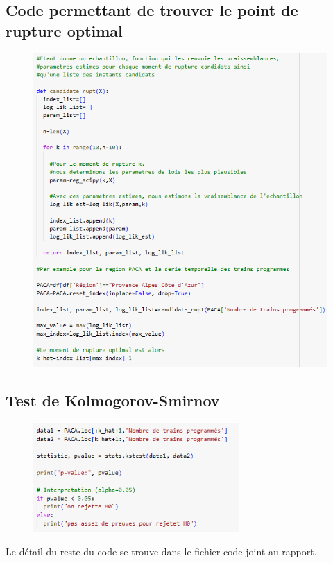 \subsection{Code permettant de trouver le point de rupture optimal}

\begin{figure}[H]
  \includegraphics[width=1\textwidth]{ANNEXE_3.png}
\end{figure}

\subsection{Test de Kolmogorov-Smirnov}

\begin{figure}[H]
  \includegraphics[width=0.7\textwidth]{ANNEXE_4.png}
\end{figure}

Le détail du reste du code se trouve dans le fichier code joint au rapport.
